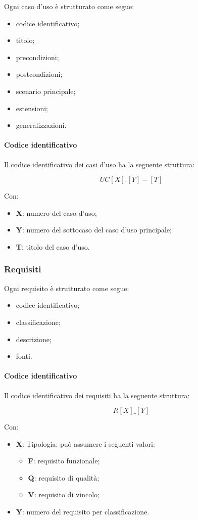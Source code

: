 Ogni caso d'uso è strutturato come segue:
\begin{itemize}
    \item codice identificativo;
    \item titolo;
    \item precondizioni;
    \item postcondizioni;
    \item scenario principale;
    \item estensioni;
    \item generalizzazioni.
\end{itemize}

\paragraph{Codice identificativo} Il codice identificativo dei casi d'uso ha la seguente struttura:

\[UC[X].[Y]-[T]\]

Con:
\begin{itemize}
    \item \textbf{X}: numero del caso d'uso;
    \item \textbf{Y}: numero del sottocaso del caso d'uso principale;
    \item \textbf{T}: titolo del caso d'uso.
\end{itemize}

\subsubsection{Requisiti}
Ogni requisito è strutturato come segue:
\begin{itemize}
    \item codice identificativo;
    \item classificazione;
    \item descrizione;
    \item fonti.
\end{itemize}

\paragraph{Codice identificativo} Il codice identificativo dei requisiti ha la seguente struttura:

\[R[X]\_[Y]\]

Con:
\begin{itemize}
    \item \textbf{X}: Tipologia: può assumere i seguenti valori:
    \begin{itemize}
        \item \textbf{F}: requisito funzionale;
        \item \textbf{Q}: requisito di qualità;
        \item \textbf{V}: requisito di vincolo;
    \end{itemize}
    \item \textbf{Y}: numero del requisito per classificazione.
\end{itemize}

